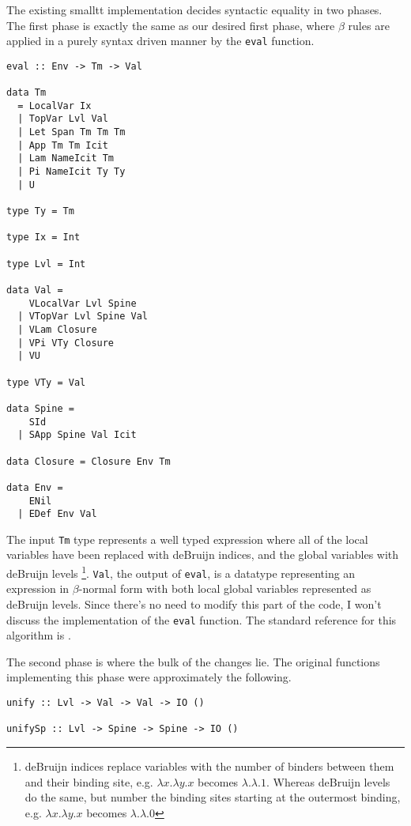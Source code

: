 \documentclass{article}
\begin{document}
The existing smalltt implementation decides syntactic equality in two phases.
The first phase is exactly the same as our desired first phase, where $\beta$ rules are applied in a purely syntax driven manner by the \lstinline{eval} function.

\begin{lstlisting}
eval :: Env -> Tm -> Val

data Tm
  = LocalVar Ix
  | TopVar Lvl Val
  | Let Span Tm Tm Tm
  | App Tm Tm Icit
  | Lam NameIcit Tm
  | Pi NameIcit Ty Ty
  | U

type Ty = Tm

type Ix = Int

type Lvl = Int

data Val =
    VLocalVar Lvl Spine
  | VTopVar Lvl Spine Val
  | VLam Closure
  | VPi VTy Closure
  | VU

type VTy = Val

data Spine =
    SId
  | SApp Spine Val Icit

data Closure = Closure Env Tm

data Env =
    ENil
  | EDef Env Val
\end{lstlisting}

The input \lstinline{Tm} type represents a well typed expression where all of the local variables have been replaced with deBruijn indices, and the global variables with deBruijn levels \footnote{deBruijn indices replace variables with the number of binders between them and their binding site, e.g. $\lambda x. \lambda y. x$ becomes $\lambda. \lambda. 1$. Whereas deBruijn levels do the same, but number the binding sites starting at the outermost binding, e.g. $\lambda x. \lambda y. x$ becomes $\lambda. \lambda. 0$}.
\lstinline{Val}, the output of \lstinline{eval}, is a datatype representing an expression in $\beta$-normal form with both local global variables represented as deBruijn levels.
Since there's no need to modify this part of the code, I won't discuss the implementation of the \lstinline{eval} function.
The standard reference for this algorithm is \citet{Coquand1996}.

The second phase is where the bulk of the changes lie.
The original functions implementing this phase were approximately the following.

\begin{lstlisting}
unify :: Lvl -> Val -> Val -> IO ()

unifySp :: Lvl -> Spine -> Spine -> IO ()
\end{lstlisting}
\end{document}
